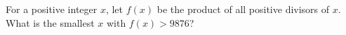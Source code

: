 For a positive integer $x$, let $f(x)$ be the product of all positive divisors of $x$. What is the smallest $x$ with $f(x)>9876$?
